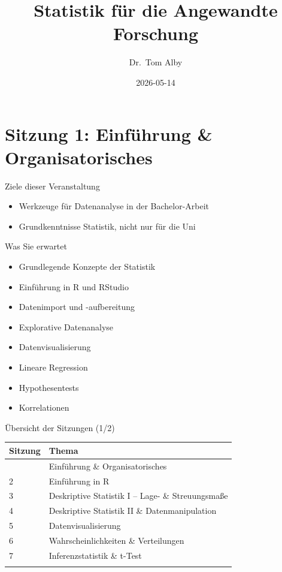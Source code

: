 \documentclass[
  ignorenonframetext,
]{beamer}
\title{\texorpdfstring{Statistik für die Angewandte
Forschung}{Statistik für die Angewandte Forschung}}
\author{Dr.~Tom Alby}
\date{2026-05-14}
\newcounter{none} %
\providecommand{\tightlist}{%
  \setlength{\itemsep}{0pt}\setlength{\parskip}{0pt}}
\begin{document}
\frame{\titlepage}


\section{Sitzung 1: Einführung \&
Organisatorisches}\label{sitzung-1-einfuxfchrung-organisatorisches}

\begin{frame}{Ziele dieser Veranstaltung}
\protect{}\label{ziele-dieser-veranstaltung}
\begin{itemize}
\tightlist
\item
  Werkzeuge für Datenanalyse in der Bachelor-Arbeit
\item
  Grundkenntnisse Statistik, nicht nur für die Uni
\end{itemize}
\end{frame}

\begin{frame}{Was Sie erwartet}
\protect{}\label{was-sie-erwartet}
\begin{itemize}
\tightlist
\item
  Grundlegende Konzepte der Statistik
\item
  Einführung in R und RStudio
\item
  Datenimport und -aufbereitung
\item
  Explorative Datenanalyse
\item
  Datenvisualisierung
\item
  Lineare Regression
\item
  Hypothesentests
\item
  Korrelationen
\end{itemize}
\end{frame}

\begin{frame}{Übersicht der Sitzungen (1/2)}
\protect{}\label{uxfcbersicht-der-sitzungen-12}
{\def\LTcaptype{none} %
\begin{longtable}[]{@{}ll@{}}
\toprule\noalign{}
Sitzung & Thema \\
\midrule\noalign{}
\endhead
1 & Einführung \& Organisatorisches \\
2 & Einführung in R \\
3 & Deskriptive Statistik I -- Lage- \& Streuungsmaße \\
4 & Deskriptive Statistik II \& Datenmanipulation \\
5 & Datenvisualisierung \\
6 & Wahrscheinlichkeiten \& Verteilungen \\
7 & Inferenzstatistik \& t-Test \\
\bottomrule\noalign{}
\end{longtable}
}
\end{frame}
\end{document}
